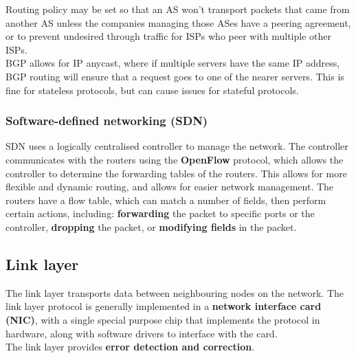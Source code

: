 Routing policy may be set so that an AS won't transport packets that came from another AS unless the companies managing those ASes have a peering agreement, or to prevent undesired through traffic for ISPs who peer with multiple other ISPs.\\
BGP allows for IP anycast, where if multiple servers have the same IP address, BGP routing will ensure that a request goes to one of the nearer servers. This is fine for stateless protocols, but can cause issues for stateful protocols.\\
\subsubsection{Software-defined networking (SDN)}
SDN uses a logically centralised controller to manage the network. The controller communicates with the routers using the \textbf{OpenFlow} protocol, which allows the controller to determine the forwarding tables of the routers. This allows for more flexible and dynamic routing, and allows for easier network management. The routers have a flow table, which can match a number of fields, then perform certain actions, including: \textbf{forwarding} the packet to specific ports or the controller, \textbf{dropping} the packet, or \textbf{modifying fields} in the packet.

\subsection{Link layer}
The link layer transports data between neighbouring nodes on the network. The link layer protocol is generally implemented in a \textbf{network interface card (NIC)}, with a single special purpose chip that implements the protocol in hardware, along with software drivers to interface with the card.\\
The link layer provides \textbf{error detection and correction}.
